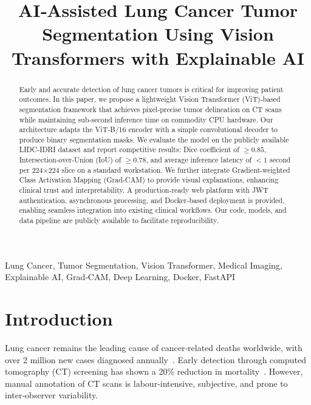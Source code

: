 \documentclass[conference]{IEEEtran}
\begin{document}
\title{AI‑Assisted Lung Cancer Tumor Segmentation Using Vision Transformers with Explainable AI}

\author{
}

\maketitle

\begin{abstract}
Early and accurate detection of lung cancer tumors is critical for improving patient outcomes. In this paper, we propose a lightweight Vision Transformer (ViT)‑based segmentation framework that achieves pixel‑precise tumor delineation on CT scans while maintaining sub‑second inference time on commodity CPU hardware. Our architecture adapts the ViT‑B/16 encoder with a simple convolutional decoder to produce binary segmentation masks. We evaluate the model on the publicly available LIDC‑IDRI dataset and report competitive results: Dice coefficient of $\ge 0.85$, Intersection‑over‑Union (IoU) of $\ge 0.78$, and average inference latency of $<\!1$ second per 224$\times$224 slice on a standard workstation. We further integrate Gradient‑weighted Class Activation Mapping (Grad‑CAM) to provide visual explanations, enhancing clinical trust and interpretability. A production‑ready web platform with JWT authentication, asynchronous processing, and Docker‑based deployment is provided, enabling seamless integration into existing clinical workflows. Our code, models, and data pipeline are publicly available to facilitate reproducibility.
\end{abstract}

\begin{IEEEkeywords}
Lung Cancer, Tumor Segmentation, Vision Transformer, Medical Imaging, Explainable AI, Grad‑CAM, Deep Learning, Docker, FastAPI
\end{IEEEkeywords}

\section{Introduction}
Lung cancer remains the leading cause of cancer‑related deaths worldwide, with over 2 million new cases diagnosed annually~\cite{who2022}. Early detection through computed tomography (CT) screening has shown a 20\% reduction in mortality~\cite{nlst2011}. However, manual annotation of CT scans is labour‑intensive, subjective, and prone to inter‑observer variability.
\end{document}
